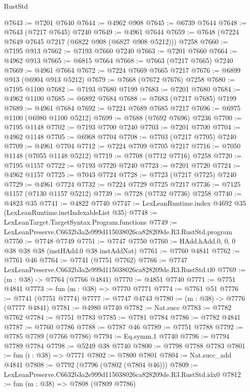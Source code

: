 \begin{lexlean}{RustStd}
\begin{coremodule}
@7643 := @7201 @7640
@7644 := @4962 @908
@7645 := @6739 @7644
@7648 := @7643 (@7217 @7645) @7240
@7649 := @4961 @7644
@7659 := @7648 (@7224 @7649 @7645 @7217 (@6822 @908 (@6827 @908 @5212))) @7258
@7660 := @7195 @913
@7662 := @7193 @7660 @7240
@7663 := @7201 @7660
@7664 := @4962 @913
@7665 := @6815 @7664
@7668 := @7663 (@7217 @7665) @7240
@7669 := @4961 @7664
@7672 := @7224 @7669 @7665 @7217
@7676 := @6899 @913 (@6904 @913 @5212)
@7679 := @7668 (@7672 @7676) @7258
@7680 := @7195 @1100
@7682 := @7193 @7680 @7199
@7683 := @7201 @7680
@7684 := @4962 @1100
@7685 := @6892 @7684
@7688 := @7683 (@7217 @7685) @7199
@7689 := @4961 @7684
@7692 := @7224 @7689 @7685 @7217
@7696 := @6975 @1100 (@6980 @1100 @5212)
@7699 := @7688 (@7692 @7696) @7236
@7700 := @7195 @1148
@7702 := @7193 @7700 @7240
@7703 := @7201 @7700
@7704 := @4962 @1148
@7705 := @6968 @7704
@7708 := @7703 (@7217 @7705) @7240
@7709 := @4961 @7704
@7712 := @7224 @7709 @7705 @7217
@7716 := @7050 @1148 (@7055 @1148 @5212)
@7719 := @7708 (@7712 @7716) @7258
@7720 := @7195 @1157
@7722 := @7193 @7720 @7240
@7723 := @7201 @7720
@7724 := @4962 @1157
@7725 := @7043 @7724
@7728 := @7723 (@7217 @7725) @7240
@7729 := @4961 @7724
@7732 := @7224 @7729 @7725 @7217
@7736 := @7125 @1157 (@7130 @1157 @5212)
@7739 := @7728 (@7732 @7736) @7258
@7740 := @4823 @35
@7741 := @4822 @7740
@7747 := LexLeanRuntime.index @4692 @35 (LexLeanRuntime.instIndexableList @35)
@7748 := LexLeanTarget.TargetSyntax.Program.functions
@7749 := LexLeanPreserve.C6632b3a2e999d115038026ca828209de.R3.RustStd.program
@7750 := @7748 @7749
@7751 := @7747 @7750
@7760 := HAdd.hAdd.{0, 0, 0} @38 @38 @38 (instHAdd.{0} @38 instAddNat)
@7761 := @7760 @4841
@7762 := @7761 @46
@7764 := @7741 (@7751 @7762)
@7766 := @7747 LexLeanPreserve.C6632b3a2e999d115038026ca828209de.R3.RustStd.tl0
@7769 := (m : @38) -> @7764 (@7766 @4841)
@7770 := @4851 @7740
@7771 := @7751 @4841
@7773 := fun (m : @38) => @7770 @7771
@7774 := @7761 @51
@7776 := @7741 (@7751 @7774)
@7777 := @7747 @4743
@7780 := (m : @38) -> @7776 (@7777 @4841)
@7781 := @4980 @7740
@7782 := Nat.succ
@7783 := @7782 @7762
@7784 := @7751 @7783
@7785 := @7781 @7784
@7786 := @7782 @4841
@7787 := @7760 @7786
@7788 := @7787 @46
@7789 := @7751 @7788
@7792 := @7785 @7789 (@7766 @7786)
@7794 := Eq.symm.{1} @7740
@7796 := @7794 @7789 @7784
@7798 := @5249 @38 @7740
@7800 := @7798 @7788 @7783
@7801 := fun (i : @38) => @7771
@7802 := @7800 @7801
@7804 := Nat.succ_add @4841
@7808 := @7792 (@7796 (@7802 (@7804 @46)))
@7809 := LexLeanPreserve.C6632b3a2e999d115038026ca828209de.R3.RustStd.idx0
@7812 := fun (m : @38) => @7808 (@7809 @7786)

\end{coremodule}
\end{lexlean}
